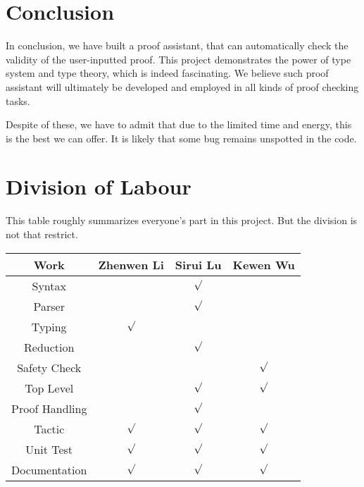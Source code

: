 \section{Conclusion}

In conclusion, we have built a proof assistant, that can automatically check the validity
of the user-inputted proof. 
This project demonstrates the power of type system and type theory,
which is indeed fascinating.
We believe such proof assistant will ultimately be developed and employed 
in all kinds of proof checking tasks.\par
Despite of these, we have to admit that due to the limited time and energy, 
this is the best we can offer. It is likely that some bug remains unspotted in the code.

\section{Division of Labour}

This table roughly summarizes everyone's part in this project. 
But the division is not that restrict.
\begin{center}
\begin{tabular}{|c|c|c|c|}
\hline
Work & Zhenwen Li & Sirui Lu & Kewen Wu\\
\hline
Syntax & & $\surd$ &\\
Parser & & $\surd$ &\\
Typing & $\surd$ & &\\
Reduction & & $\surd$ &\\
Safety Check & & & $\surd$\\
Top Level & & $\surd$ & $\surd$\\
Proof Handling & & $\surd$ & \\
Tactic & $\surd$ & $\surd$ & $\surd$\\
Unit Test & $\surd$ & $\surd$ & $\surd$\\
Documentation & $\surd$ & $\surd$ & $\surd$\\
\hline
\end{tabular}
\end{center}

